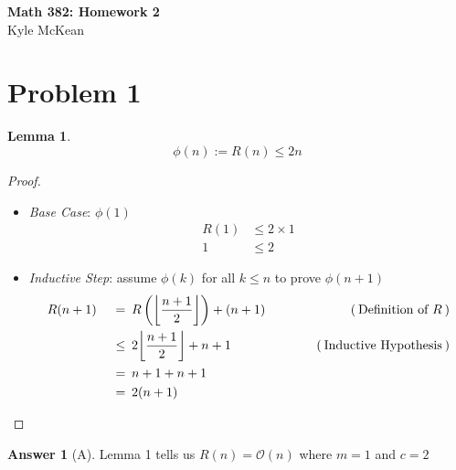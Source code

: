 \documentclass{article}
\newtheorem{lemma}{Lemma}
\theoremstyle{definition}
\newtheorem*{answer}{Answer}
\DeclarePairedDelimiter\floor{\lfloor}{\rfloor}
\newcommand{\evidence}[1]{\ensuremath{\hspace{3em} (\hspace{0.2em} \text{#1} \hspace{0.2em})}}
\newcommand{\asymptotic}[3]{\ensuremath{#2 = #1(#3)}}
\newcommand{\bigO}[2]{\asymptotic{\mathcal{O}}{#1}{#2}}
\newcommand{\relation}[1]{\ensuremath{\hspace{0.2em} {{} #1 {}} \hspace{0.2em}}}
\newcommand{\equal}{\relation{=}}
\newcommand{\lesseq}{\relation{\le}}
\newcommand{\parens}[1]{\left(#1\right)}
\begin{document}
\noindent
\LARGE\textbf{Math 382: Homework 2} \\
\large Kyle McKean

\section*{Problem 1}

\begin{lemma}
  \begin{equation*}
    \phi(n) := R(n) \le 2n
  \end{equation*}
\end{lemma}
\begin{proof}
  \hfill
  \begin{itemize}
  \item
    \textit{Base Case}: $\phi(1)$
    \begin{align*}
      R(1) &\le 2 \times 1 \\
      1    &\le 2
    \end{align*}
  \item
    \textit{Inductive Step}: assume $\phi(k)$ for all $k \le n$ to prove $\phi(n + 1)$
    \begin{alignat*}{4}
      & R(n + 1) & \equal  & R\parens{\floor*{\frac{n + 1}{2}}} + (n + 1) & \evidence{Definition of $R$} \\
      & {}       & \lesseq & 2\floor*{\frac{n + 1}{2}} + n + 1            & \evidence{Inductive Hypothesis} \\
      & {}       & \equal  & n + 1 + n + 1                                & {} \\
      & {}       & \equal  & 2 (n + 1)                                    & \qedhere
    \end{alignat*}
  \end{itemize}
\end{proof}
\begin{answer}[A]
  Lemma 1 tells us $\bigO{R(n)}{n}$ where $m = 1$ and $c = 2$
\end{answer}
\end{document}
